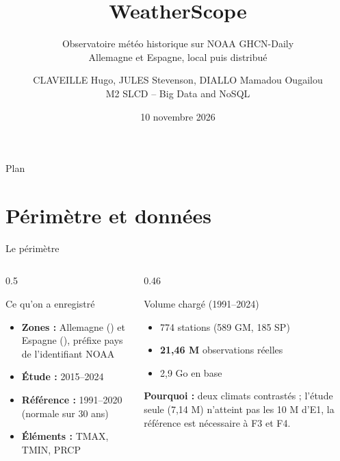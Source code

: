 \documentclass[aspectratio=169]{pres}
\title[WeatherScope]{WeatherScope}
\subtitle{Observatoire météo historique sur NOAA GHCN-Daily\\Allemagne et Espagne, local puis distribué}
\author[Claveille, Jules, Diallo]{CLAVEILLE Hugo, JULES Stevenson, DIALLO Mamadou Ougailou\\[0.3em]\small M2 SLCD -- Big Data and NoSQL}
\date{10 novembre 2026}
\begin{document}
\begin{frame}
  \titlepage
\end{frame}

\begin{frame}{Plan}
  \setcounter{tocdepth}{1}
  \tableofcontents
\end{frame}

\section{Périmètre et données}

\begin{frame}{Le périmètre}
  \begin{columns}[T]
    \begin{column}{0.5\textwidth}
      \begin{block}{Ce qu'on a enregistré}
        \begin{itemize}
          \item \textbf{Zones :} Allemagne () et Espagne (), préfixe pays de l'identifiant NOAA
          \item \textbf{Étude :} 2015--2024
          \item \textbf{Référence :} 1991--2020 (normale sur 30 ans)
          \item \textbf{Éléments :} TMAX, TMIN, PRCP
        \end{itemize}
      \end{block}
    \end{column}
    \begin{column}{0.46\textwidth}
      \begin{block}{Volume chargé (1991--2024)}
        \begin{itemize}
          \item 774 stations (589 GM, 185 SP)
          \item \textbf{21,46 M} observations réelles
          \item 2,9 Go en base
        \end{itemize}
      \end{block}
      \small
      \textbf{Pourquoi :} deux climats contrastés ; l'étude seule (7,14 M) n'atteint pas les 10 M d'E1, la référence est nécessaire à F3 et F4.
    \end{column}
  \end{columns}
\end{frame}
\end{document}

